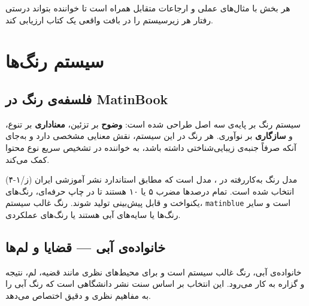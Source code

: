 \documentclass{matinbook}
\begin{document}
هر بخش با مثال‌های عملی و ارجاعات متقابل همراه است تا خواننده بتواند
درستی رفتار هر زیرسیستم را در بافت واقعی یک کتاب ارزیابی کند.

\clearpage

\tableofcontents
\clearpage

\listoffigures
\clearpage

\listoftables
\clearpage

\mainmatter
\mainmattergeometry

\chapter{سیستم رنگ‌ها}
\label{chap:colors}

\section{فلسفه‌ی رنگ در MatinBook}
\label{sec:color-philosophy}

سیستم رنگ  بر پایه‌ی سه اصل طراحی شده است: \textbf{وضوح}
بر تزئین، \textbf{معناداری} بر تنوع، و \textbf{سازگاری} بر نوآوری.
هر رنگ در این سیستم، نقش معنایی مشخصی دارد و به‌جای آنکه صرفاً
جنبه‌ی زیبایی‌شناختی داشته باشد، به خواننده در تشخیص سریع نوع محتوا
کمک می‌کند.

مدل رنگ به‌کاررفته در ، مدل  است که مطابق
استاندارد نشر آموزشی ایران (ز/۱-۴) انتخاب شده است. تمام درصدها
مضرب ۵ یا ۱۰ هستند تا در چاپ حرفه‌ای، رنگ‌های یکنواخت و قابل
پیش‌بینی تولید شوند. رنگ غالب سیستم، \texttt{matinblue} است و
سایر رنگ‌ها یا سایه‌های آبی هستند یا رنگ‌های عملکردی.


\section{خانواده‌ی آبی — قضایا و لم‌ها}
\label{sec:color-blue}

خانواده‌ی آبی، رنگ غالب سیستم است و برای محیط‌های نظری مانند
قضیه، لم، نتیجه و گزاره به کار می‌رود. این انتخاب بر اساس
سنت نشر دانشگاهی است که رنگ آبی را به مفاهیم نظری و دقیق
اختصاص می‌دهد.
\end{document}
